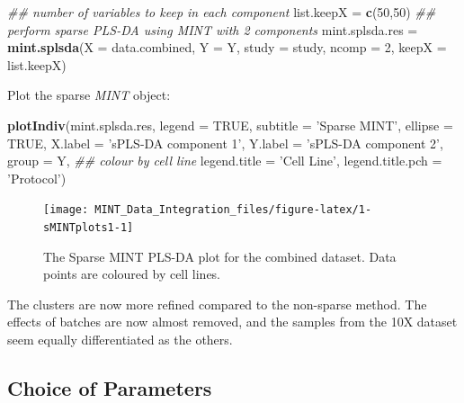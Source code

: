 \documentclass[]{book}
\newenvironment{Shaded}{\begin{snugshade}}{\end{snugshade}}
\newcommand{\CommentTok}[1]{\textcolor[rgb]{0.56,0.35,0.01}{\textit{#1}}}
\newcommand{\DataTypeTok}[1]{\textcolor[rgb]{0.13,0.29,0.53}{#1}}
\newcommand{\DecValTok}[1]{\textcolor[rgb]{0.00,0.00,0.81}{#1}}
\newcommand{\KeywordTok}[1]{\textcolor[rgb]{0.13,0.29,0.53}{\textbf{#1}}}
\newcommand{\NormalTok}[1]{#1}
\newcommand{\OtherTok}[1]{\textcolor[rgb]{0.56,0.35,0.01}{#1}}
\newcommand{\StringTok}[1]{\textcolor[rgb]{0.31,0.60,0.02}{#1}}
\theoremstyle{definition}
\theoremstyle{definition}
\theoremstyle{definition}
\theoremstyle{remark}
\begin{document}
\begin{Shaded}
\begin{Highlighting}[]
\CommentTok{## number of variables to keep in each component}
\NormalTok{list.keepX =}\StringTok{ }\KeywordTok{c}\NormalTok{(}\DecValTok{50}\NormalTok{,}\DecValTok{50}\NormalTok{) }
\CommentTok{## perform sparse PLS-DA using MINT with 2 components}
\NormalTok{mint.splsda.res =}\StringTok{ }\KeywordTok{mint.splsda}\NormalTok{(}\DataTypeTok{X =}\NormalTok{ data.combined, }\DataTypeTok{Y =}\NormalTok{ Y,}
                              \DataTypeTok{study =}\NormalTok{ study, }\DataTypeTok{ncomp =} \DecValTok{2}\NormalTok{, }\DataTypeTok{keepX =}\NormalTok{ list.keepX)}
\end{Highlighting}
\end{Shaded}

Plot the sparse \emph{MINT} object:

\begin{Shaded}
\begin{Highlighting}[]
\KeywordTok{plotIndiv}\NormalTok{(mint.splsda.res,}
          \DataTypeTok{legend  =} \OtherTok{TRUE}\NormalTok{, }\DataTypeTok{subtitle =} \StringTok{'Sparse MINT'}\NormalTok{, }\DataTypeTok{ellipse =} \OtherTok{TRUE}\NormalTok{,}
          \DataTypeTok{X.label =} \StringTok{'sPLS-DA component 1'}\NormalTok{, }
          \DataTypeTok{Y.label =} \StringTok{'sPLS-DA component 2'}\NormalTok{,}
          \DataTypeTok{group =}\NormalTok{ Y, }\CommentTok{## colour by cell line}
          \DataTypeTok{legend.title =} \StringTok{'Cell Line'}\NormalTok{,}
          \DataTypeTok{legend.title.pch =} \StringTok{'Protocol'}\NormalTok{)}
\end{Highlighting}
\end{Shaded}

\begin{figure}[ht]

{\centering \texttt{[image: MINT\_Data\_Integration\_files/figure-latex/1-sMINTplots1-1]} 

}

\caption{The Sparse MINT PLS-DA plot for the combined dataset. Data points are coloured by cell lines.}\label{fig:1-sMINTplots1}
\end{figure}

The clusters are now more refined compared to the non-sparse method. The
effects of batches are now almost removed, and the samples from the 10X
dataset seem equally differentiated as the others.

\hypertarget{choice-of-parameters}{%
\subsection{Choice of Parameters}\label{choice-of-parameters}}
\end{document}
